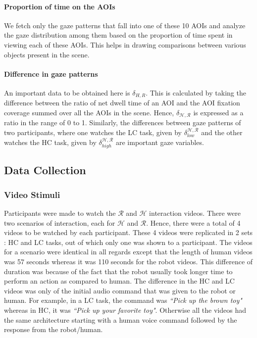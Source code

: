 \documentclass[a4,twocolumn,10pt]{article}
\begin{document}
\paragraph{Proportion of time on the AOIs}

We fetch only the gaze patterns that fall into one of these 10 AOIs and analyze
the gaze distribution among them based on the proportion of time spent in
viewing each of these AOIs. This helps in drawing comparisons between various
objects present in the scene. 

\paragraph{Difference in gaze patterns}

An important data to be obtained here is $\delta_{H,R}$. This is calculated by
taking the difference between the ratio of net dwell time of an AOI and the AOI
fixation coverage summed over all the AOIs in the scene. Hence,
$\delta_{\mathcal{H},\mathcal{R}}$ is expressed as a ratio in the range of 0 to
1. Similarly, the differences between gaze patterns of two participants, where
one watches the LC task, given by $\delta_{low}^{\mathcal{H},\mathcal{R}}$ and
the other watches the HC task, given by
$\delta_{high}^{\mathcal{H},\mathcal{R}}$ are important gaze variables.

\subsection{Data Collection}

\subsubsection{Video Stimuli}

Participants were made to watch the $\mathcal{R}$ and $\mathcal{H}$ interaction
videos. There were two scenarios of interaction, each for $\mathcal{H}$ and
$\mathcal{R}$. Hence, there were a total of 4 videos to be watched by each
participant. These 4 videos were replicated in 2 sets : HC and LC tasks, out of
which only one was shown to a participant. The videos for a scenario were
identical in all regards except that the length of human videos was 57 seconds
whereas it was 110 seconds for the robot videos. This difference of duration was
because of the fact that the robot usually took longer time to perform an action
as compared to human. The difference in the HC and LC videos was only of the
initial audio command that was given to the robot or human. For example, in a LC
task, the command was \textit{``Pick up the brown toy"} whereas in HC, it was
\textit{``Pick up your favorite toy"}. Otherwise all the videos had the same
architecture starting with a human voice command followed by the response from
the robot/human.
\end{document}
